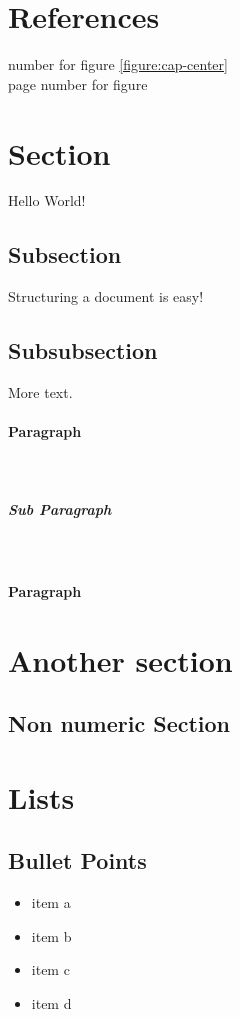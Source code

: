 \documentclass[12pt]{article}
\begin{document}
\pagebreak
\section{References}

number for figure \ref{figure:cap-center} \\
page number for figure \pageref{figure:cap-center}

\section{Section}

Hello World!

\subsection{Subsection}

Structuring a document is easy!

\subsection{Subsubsection}

More text.

\paragraph{Paragraph}
\lipsum[1]\\

\subparagraph{Sub Paragraph}
\lipsum[1]\\

\paragraph{Paragraph}
\lipsum[1]

\section{Another section}

\subsection*{Non numeric Section}

\section{Lists}

\subsection*{Bullet Points}
\begin{itemize}
\item item a
\item item b
\item item c
\item item d
\end{itemize}
\end{document}
